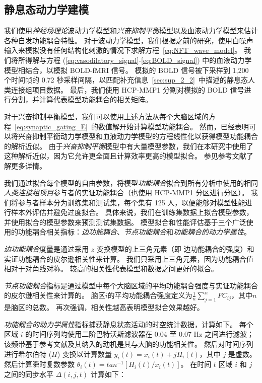 \documentclass[lang=cn,a4paper,newtx,citestyle=gb7714-2015, bibstyle=gb7714-2015]{elegantpaper}
\begin{document}
\subsection{静息态动力学建模} \label{sec:modelling_resting}

我们使用\textit{神经场理论}波动力学模型和\textit{兴奋抑制平衡}模型以及血液动力学模型来估计各种自发功能耦合特性。
对于波动力学模型，我们根据之前的研究\cite{robinson2005multiscale,sanz2018nftsim}，使用白噪声输入来模拟没有任何结构化刺激的情况下求解方程~\ref{eq:NFT_wave_model}。
我们将所得解与方程 (\ref{eq:vasodilatory_signal}-\ref{eq:BOLD_signal}) 中的血液动力学模型相结合，以模拟 BOLD-fMRI 信号。
模拟的 BOLD 信号被下采样到 1,200 个时间帧的 0.72 秒采样间隔，以匹配补充信息~\ref{sec:sup_2_2}~中描述的静息态人类连接组项目数据。
最后，我们使用 HCP-MMP1 分割对模拟的 BOLD 信号进行分割，并计算代表模型功能耦合的相关矩阵。


对于兴奋抑制平衡模型，我们可以使用上述方法从每个大脑区域的方程~\ref{eq:synaptic_gating_E}~的数值解开始计算模型功能耦合。
然而，已经表明可以将兴奋抑制平衡动力学模型和血液动力学模型的方程线性化以获得模型功能耦合\cite{demirtacs2019hierarchical}的解析近似。
由于\textit{兴奋抑制平衡}模型中有大量模型参数，我们在本研究中使用了这种解析近似，因为它允许更全面且计算效率更高的模型拟合。
参见参考文献\cite{demirtacs2019hierarchical}了解更多详情。


我们通过拟合每个模型的自由参数，将模型\textit{功能耦合}拟合到所有分析中使用的相同\textit{人类连接组项目}参与者的实证功能耦合（也使用 HCP-MMP1 分区进行分区）。
我们将参与者样本分为训练集和测试集，每个集有 125 人，以便能够对模型性能进行样本外评估并避免过度拟合。
具体来说，我们在训练集数据上拟合模型参数，并使用拟合的模型参数来预测测试集数据。
模型拟合和性能评估基于三个广泛使用的功能耦合相关指标\cite{deco2021dynamical,aquino2022intersection}：\textit{边功能耦合}、\textit{节点功能耦合}和\textit{功能耦合的动力学属性}。


\textit{边功能耦合}度量是通过采用 $ z $ 变换模型的上三角元素（即 边功能耦合的强度）和实证功能耦合的皮尔逊相关性来计算。
我们只采用上三角元素，因为功能耦合值相对于对角线对称。
较高的相关性代表模型和数据之间更好的拟合。


\textit{节点功能耦合}指标是通过模型中每个大脑区域的平均功能耦合强度与实证功能耦合的皮尔逊相关性来计算的。
脑区$ i $的平均功能耦合强度定义为$ \frac{1}{n} \sum_{j=1}^{n} FC_{ij} $，其中$ n $是脑区的总数。
再次强调，相关性越高表明模型拟合效果越好。


\textit{功能耦合的动力学属性}指标捕获静息状态活动的时空统计数据，计算如下\cite{aquino2022intersection}。
每个区域 $ i $ 的时间序列均使用二阶巴特沃斯滤波器在 0.04 至 0.07 Hz 之间进行滤波；
该频带基于参考文献\cite{deco2017dynamics}及其纳入的动机是其与大脑的功能相关性\cite{glerean2012functional,pang2019power}。
然后对时间序列进行希尔伯特 ($ H $) 变换以计算数量 $ y_i(t) = x_i(t) + jH_i (t) $，其中 $ j $ 是虚数。
然后计算瞬时复数参数 $ \theta_i(t) = tan^{-1} [H_i(t) / x_i(t)] $。
在时间 $ t $ 区域 $ i $ 和 $ j $ 之间的同步水平 $ \Delta(i,j,t) $ 计算如下：
\end{document}
